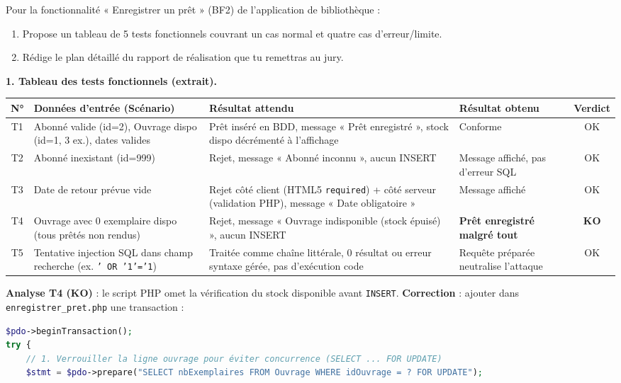 \documentclass[11pt]{article}
\begin{document}
\begin{exoresolu}
Pour la fonctionnalité « Enregistrer un prêt » (BF2) de l'application de bibliothèque :
\begin{enumerate}
\item Propose un tableau de 5 tests fonctionnels couvrant un cas normal et quatre cas d'erreur/limite.
\item Rédige le plan détaillé du rapport de réalisation que tu remettras au jury.
\end{enumerate}
\tcblower
\textbf{1. Tableau des tests fonctionnels (extrait).}
\begin{center}
\begin{tabularx}{\linewidth}{|c|X|X|X|c|}
\hline
\rowcolor{popblueL} \textbf{N°} & \textbf{Données d'entrée (Scénario)} & \textbf{Résultat attendu} & \textbf{Résultat obtenu} & \textbf{Verdict} \\
\hline
T1 & Abonné valide (id=2), Ouvrage dispo (id=1, 3 ex.), dates valides & Prêt inséré en BDD, message « Prêt enregistré », stock dispo décrémenté à l'affichage & Conforme & OK \\
\hline
T2 & Abonné inexistant (id=999) & Rejet, message « Abonné inconnu », aucun INSERT & Message affiché, pas d'erreur SQL & OK \\
\hline
T3 & Date de retour prévue vide & Rejet côté client (HTML5 \texttt{required}) + côté serveur (validation PHP), message « Date obligatoire » & Message affiché & OK \\
\hline
T4 & Ouvrage avec 0 exemplaire dispo (tous prêtés non rendus) & Rejet, message « Ouvrage indisponible (stock épuisé) », aucun INSERT & \textbf{Prêt enregistré malgré tout} & \textbf{KO} \\
\hline
T5 & Tentative injection SQL dans champ recherche (ex. \texttt{' OR '1'='1}) & Traitée comme chaîne littérale, 0 résultat ou erreur syntaxe gérée, pas d'exécution code & Requête préparée neutralise l'attaque & OK \\
\hline
\end{tabularx}
\end{center}
\textbf{Analyse T4 (KO)} : le script PHP omet la vérification du stock disponible avant \texttt{INSERT}. \textbf{Correction} : ajouter dans \texttt{enregistrer\_pret.php} une transaction :
\begin{lstlisting}[language=Php]
$pdo->beginTransaction();
try {
    // 1. Verrouiller la ligne ouvrage pour éviter concurrence (SELECT ... FOR UPDATE)
    $stmt = $pdo->prepare("SELECT nbExemplaires FROM Ouvrage WHERE idOuvrage = ? FOR UPDATE");

\end{lstlisting}
\end{exoresolu}
\end{document}
